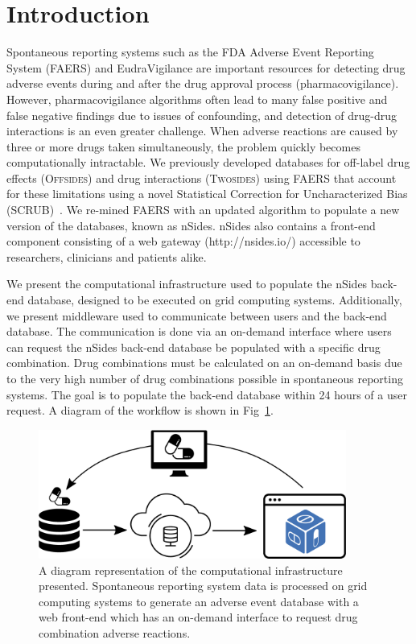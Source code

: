 \documentclass{ws-procs11x85}
\begin{document}
\bodymatter

\section{Introduction}

Spontaneous reporting systems such as the FDA Adverse Event Reporting
System (FAERS) and EudraVigilance are important resources for
detecting drug adverse events during and after the drug approval
process (pharmacovigilance). However, pharmacovigilance algorithms
often lead to many false positive and false negative findings due to
issues of confounding, and detection of drug-drug interactions is an
even greater challenge. When adverse reactions are caused by three or
more drugs taken simultaneously, the problem quickly becomes
computationally intractable. We previously developed databases for
off-label drug effects (O\textsc{ffsides}) and drug interactions
(T\textsc{wosides}) using FAERS that account for these limitations
using a novel Statistical Correction for Uncharacterized Bias
(SCRUB)~\cite{Tatonetti2012}.  We re-mined FAERS with an updated
algorithm to populate a new version of the databases, known as nSides.
nSides also contains a front-end component consisting of a web gateway
(http://nsides.io/) accessible to researchers, clinicians and patients
alike.

We present the computational infrastructure used to populate the
nSides back-end database, designed to be executed on grid computing
systems. Additionally, we present middleware used to communicate
between users and the back-end database.  The communication is done
via an on-demand interface where users can request the nSides back-end
database be populated with a specific drug combination. Drug
combinations must be calculated on an on-demand basis due to the very
high number of drug combinations possible in spontaneous reporting
systems. The goal is to populate the back-end database within 24 hours
of a user request. A diagram of the workflow is shown in
Fig~\ref{fig:workflow}.

\begin{figure}[h]
\centerline{\includegraphics[width=0.9\textwidth]{workflow}}
\caption{A diagram representation of the computational infrastructure
  presented. Spontaneous reporting system data is processed on grid
  computing systems to generate an adverse event database with a web
  front-end which has an on-demand interface to request drug
  combination adverse reactions. }
\label{fig:workflow}
\end{figure}
\end{document}

